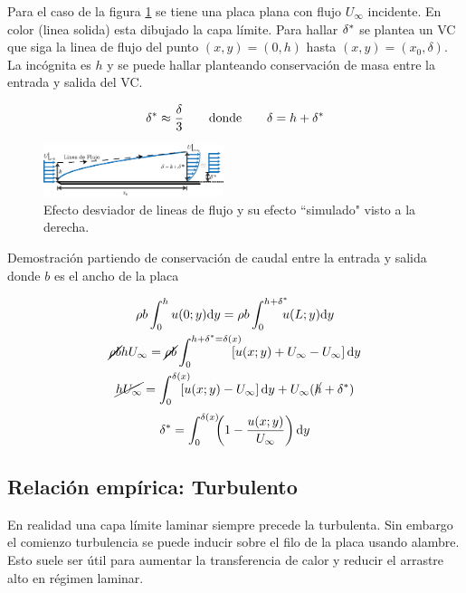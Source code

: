 Para el caso de la figura \ref{fig:displthickness} se tiene una placa plana con flujo $U_\infty$ incidente. En color (linea solida) esta dibujado la capa límite. Para hallar $\delta^{*}$ se plantea un VC que siga la linea de flujo del punto $(x,y)=(0,h)$ hasta $(x,y)=(x_0,\delta)$. La incógnita es $h$ y se puede hallar planteando conservación de masa entre la entrada y salida del VC.

\begin{equation}
    \delta^{*} \approx \frac{\delta}{3}  \qquad \textrm{donde}\qquad  \delta=h+\delta^{*}
\end{equation}


\begin{figure}[htb!]
    \centering
    \includegraphics[width=0.47\textwidth]{fig/BLdispthick.eps}
    \caption{Efecto desviador de lineas de flujo y su efecto ``simulado"{} visto a la derecha.}
    \label{fig:displthickness}
\end{figure}

Demostración partiendo de conservación de caudal entre la entrada y salida donde $b$ es el ancho de la placa

\begin{gather*}
	\rho b \int^h_0 u(0;y)\di y = \rho b \int^{h+\dstar}_0 \!\!\!\!u(L;y)\di y \\
	\cancel{\rho b} h U_\infty =\cancel{\rho b}\int^{h+\dstar=\delta(x)}_0 \!\!\!\!\!\!\left[u(x;y)+U_\infty-U_\infty \right]\di y\\	
	\cancel{hU_\infty} = \int^{\delta(x)}_0 \!\!\!\!\!\!\left[u(x;y)-U_\infty \right]\di y+U_\infty (\cancel{h}+\dstar)
\end{gather*}
\begin{equation}
	\delta^{*} = \int_0^{\delta(x)} \!\!\!\left(1-\frac{u(x;y)}{U_\infty} \right) \textrm{d} y
\end{equation}



\subsection{Relación empírica: Turbulento}
En realidad una capa límite laminar siempre precede la turbulenta. Sin embargo el comienzo turbulencia se puede inducir sobre el filo de la placa usando alambre. Esto suele ser útil para aumentar la transferencia de calor y reducir el arrastre alto en régimen laminar.

